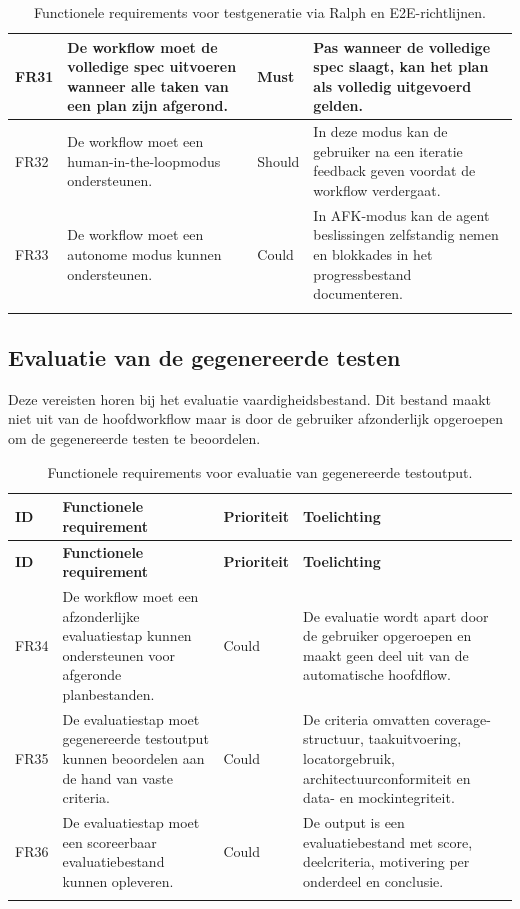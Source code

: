 \begin{longtable}{p{}p{}p{}p{}}
    \midrule
    FR31 & De workflow moet de volledige spec uitvoeren wanneer alle taken van een plan zijn afgerond. & Must & Pas wanneer de volledige spec slaagt, kan het plan als volledig uitgevoerd gelden. \\
    \midrule
    FR32 & De workflow moet een human-in-the-loopmodus ondersteunen. & Should & In deze modus kan de gebruiker na een iteratie feedback geven voordat de workflow verdergaat. \\
    \midrule
    FR33 & De workflow moet een autonome modus kunnen ondersteunen. & Could & In AFK-modus kan de agent beslissingen zelfstandig nemen en blokkades in het progressbestand documenteren. \\
    
    \bottomrule
    \caption[Functionele requirements voor testgeneratie via Ralph]{Functionele requirements voor testgeneratie via Ralph en E2E-richtlijnen.}
    \label{tab:fr-ralph-e2e}
\end{longtable}

\subsection{Evaluatie van de gegenereerde testen}
Deze vereisten horen bij het evaluatie vaardigheidsbestand. Dit bestand maakt niet uit van de hoofdworkflow maar is door de gebruiker afzonderlijk opgeroepen om de gegenereerde testen te beoordelen.

\begin{longtable}{p{}p{}p{}p{}}
    \toprule
    \textbf{ID} & \textbf{Functionele requirement} & \textbf{Prioriteit} & \textbf{Toelichting} \\
    \midrule
    \endfirsthead
    
    \toprule
    \textbf{ID} & \textbf{Functionele requirement} & \textbf{Prioriteit} & \textbf{Toelichting} \\
    \midrule
    \endhead
    
    FR34 & De workflow moet een afzonderlijke evaluatiestap kunnen ondersteunen voor afgeronde planbestanden. & Could & De evaluatie wordt apart door de gebruiker opgeroepen en maakt geen deel uit van de automatische hoofdflow. \\
    \midrule
    FR35 & De evaluatiestap moet gegenereerde testoutput kunnen beoordelen aan de hand van vaste criteria. & Could & De criteria omvatten coverage-structuur, taakuitvoering, locatorgebruik, architectuurconformiteit en data- en mockintegriteit. \\
    \midrule
    FR36 & De evaluatiestap moet een scoreerbaar evaluatiebestand kunnen opleveren. & Could & De output is een evaluatiebestand met score, deelcriteria, motivering per onderdeel en conclusie. \\
    
    \bottomrule
    \caption[Functionele requirements voor evaluatie van testoutput]{Functionele requirements voor evaluatie van gegenereerde testoutput.}
    \label{tab:fr-evaluatie-testoutput}
\end{longtable}


